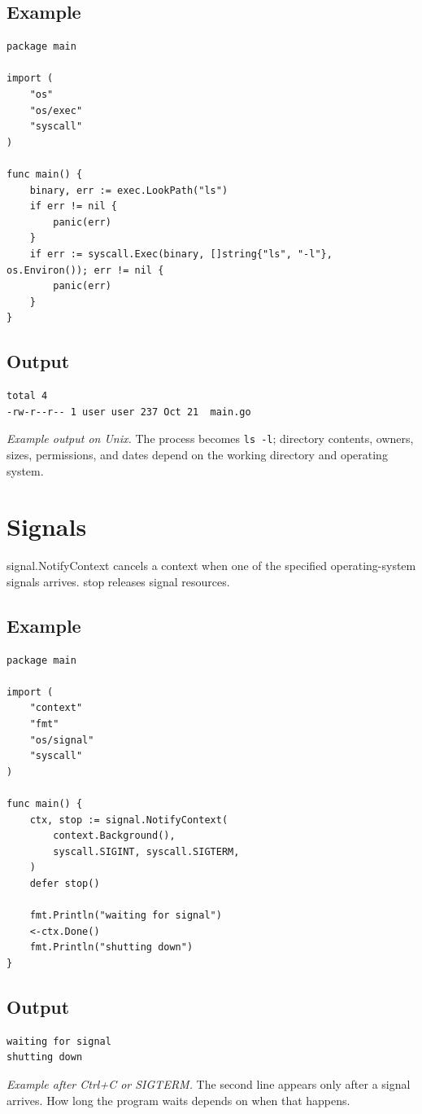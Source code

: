 \documentclass[10pt,oneside]{article}
\newcommand{\sectionline}{\par\vspace{4pt}{\color{rule}\hrule height .5pt}\vspace{7pt}\color{ink}\noindent}
\begin{document}
\subsection*{Example}
\begin{lstlisting}[style=gocode]
package main

import (
	"os"
	"os/exec"
	"syscall"
)

func main() {
	binary, err := exec.LookPath("ls")
	if err != nil {
		panic(err)
	}
	if err := syscall.Exec(binary, []string{"ls", "-l"}, os.Environ()); err != nil {
		panic(err)
	}
}
\end{lstlisting}


\subsection*{Output}
\begin{lstlisting}[style=terminal]
total 4
-rw-r--r-- 1 user user 237 Oct 21  main.go
\end{lstlisting}
\emph{Example output on Unix.} The process becomes \texttt{ls -l}; directory contents, owners, sizes, permissions, and dates depend on the working directory and operating system.
\clearpage
\section{Signals}
\sectionline
signal.NotifyContext cancels a context when one of the specified operating-system signals arrives. stop releases signal resources.\par
\subsection*{Example}
\begin{lstlisting}[style=gocode]
package main

import (
	"context"
	"fmt"
	"os/signal"
	"syscall"
)

func main() {
	ctx, stop := signal.NotifyContext(
		context.Background(),
		syscall.SIGINT, syscall.SIGTERM,
	)
	defer stop()

	fmt.Println("waiting for signal")
	<-ctx.Done()
	fmt.Println("shutting down")
}
\end{lstlisting}


\subsection*{Output}
\begin{lstlisting}[style=terminal]
waiting for signal
shutting down
\end{lstlisting}
\emph{Example after Ctrl+C or SIGTERM.} The second line appears only after a signal arrives. How long the program waits depends on when that happens.
\clearpage
\end{document}
